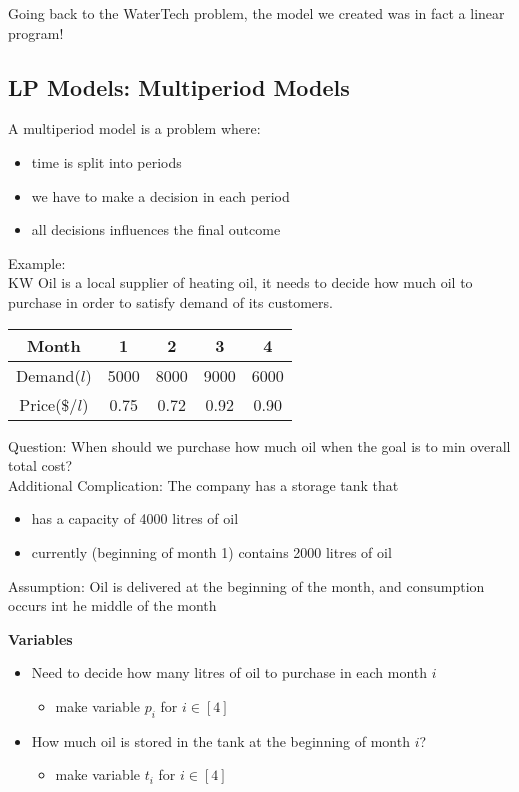 \documentclass[letterpaper, 12pt]{article}
\begin{document}
{    Going back to the WaterTech problem, the model we created was in fact a linear program!\\

    \subsection{LP Models: Multiperiod Models}
    A multiperiod model is a problem where:\\
    \begin{itemize}
        \item time is split into periods
        \item we have to make a decision in each period
        \item all decisions influences the final outcome
    \end{itemize}
    Example:\\
    KW Oil is a local supplier of heating oil, it needs to decide how much oil to purchase in order to satisfy demand of its customers.\\
    \bigskip
    \begin{tabular}{|c|c|c|c|c|}
        \hline
        Month & 1 & 2 & 3 & 4\\
        \hline
        Demand($l$) & 5000 & 8000 & 9000 & 6000\\
        \hline
        Price(\$/$l$) & 0.75 & 0.72 & 0.92 & 0.90\\
        \hline
    \end{tabular}
    \bigskip

    Question: When should we purchase how much oil when the goal is to min overall total cost?\\
    Additional Complication: The company has a storage tank that\\
    \begin{itemize}
        \item has a capacity of 4000 litres of oil
        \item currently (beginning of month 1) contains 2000 litres of oil
    \end{itemize}
    Assumption: Oil is delivered at the beginning of the month, and consumption occurs int he middle of the month

    \bigskip
    {\large\textbf{Variables}}
    \begin{itemize}
        \item Need to decide how many litres of oil to purchase in each month $i$
        \begin{itemize}
            \item make variable $p_i$ for $i \in [4]$
        \end{itemize}
        \item How much oil is stored in the tank at the beginning of month $i$?
        \begin{itemize}
            \item make variable $t_i$ for $i \in [4]$
        \end{itemize}
    \end{itemize}

}
\end{document}
